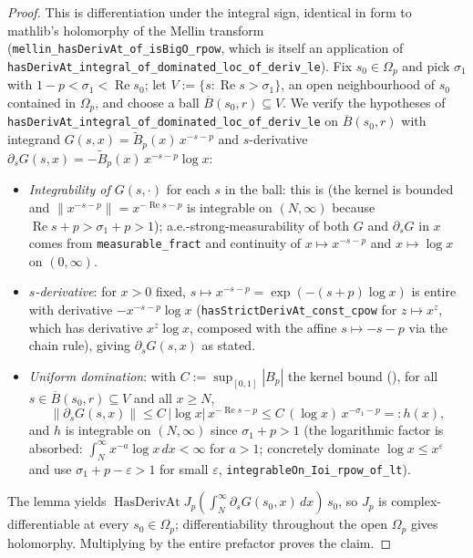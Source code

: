 \begin{proof}
This is differentiation under the integral sign, identical in form to mathlib's holomorphy
of the Mellin transform (\texttt{mellin\_hasDerivAt\_of\_isBigO\_rpow}, which is itself an
application of \texttt{hasDerivAt\_integral\_of\_dominated\_loc\_of\_deriv\_le}). Fix
$s_0 \in \Omega_p$ and pick $\sigma_1$ with $1 - p < \sigma_1 < \operatorname{Re} s_0$; let
$V := \{s : \operatorname{Re} s > \sigma_1\}$, an open neighbourhood of $s_0$ contained in
$\Omega_p$, and choose a ball $\overline{B}(s_0, r) \subseteq V$. We verify the hypotheses
of \texttt{hasDerivAt\_integral\_of\_dominated\_loc\_of\_deriv\_le} on $\overline{B}(s_0,r)$
with integrand $G(s,x) = \widetilde{B}_p(x)\,x^{-s-p}$ and $s$-derivative
$\partial_s G(s,x) = -\widetilde{B}_p(x)\,x^{-s-p}\log x$:
\begin{itemize}
\item \emph{Integrability of $G(s,\cdot)$} for each $s$ in the ball: this is
   (the kernel is bounded and
  $\|x^{-s-p}\| = x^{-\operatorname{Re}s - p}$ is integrable on $(N,\infty)$ because
  $\operatorname{Re} s + p > \sigma_1 + p > 1$); a.e.-strong-measurability of both $G$ and
  $\partial_s G$ in $x$ comes from \texttt{measurable\_fract} and continuity of
  $x \mapsto x^{-s-p}$ and $x \mapsto \log x$ on $(0,\infty)$.
\item \emph{$s$-derivative}: for $x > 0$ fixed, $s \mapsto x^{-s-p} = \exp(-(s+p)\log x)$ is
  entire with derivative $-x^{-s-p}\log x$ (\texttt{hasStrictDerivAt\_const\_cpow} for
  $z \mapsto x^{z}$, which has derivative $x^{z}\log x$, composed with the affine
  $s \mapsto -s-p$ via the chain rule), giving $\partial_s G(s,x)$ as stated.
\item \emph{Uniform domination}: with $C := \sup_{[0,1]}|B_p|$ the kernel bound
  (), for all $s \in \overline{B}(s_0,r) \subseteq V$ and all
  $x \ge N$,
  \[
    \|\partial_s G(s,x)\| \le C\,|\log x|\,x^{-\operatorname{Re}s - p}
      \le C\,(\log x)\,x^{-\sigma_1 - p} =: h(x),
  \]
  and $h$ is integrable on $(N,\infty)$ since $\sigma_1 + p > 1$ (the logarithmic factor is
  absorbed: $\int_N^{\infty} x^{-a}\log x\,dx < \infty$ for $a > 1$; concretely dominate
  $\log x \le x^{\varepsilon}$ and use $\sigma_1 + p - \varepsilon > 1$ for small
  $\varepsilon$, \texttt{integrableOn\_Ioi\_rpow\_of\_lt}).
\end{itemize}
The lemma yields $\operatorname{HasDerivAt} J_p (\textstyle\int_N^\infty \partial_s G(s_0,x)\,dx)\,s_0$,
so $J_p$ is complex-differentiable at every $s_0 \in \Omega_p$; differentiability throughout
the open $\Omega_p$ gives holomorphy. Multiplying by the entire prefactor proves the claim.
\end{proof}

